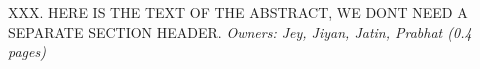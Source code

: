 XXX.  HERE IS THE TEXT OF THE ABSTRACT, WE DONT NEED A SEPARATE SECTION HEADER.
\textit{Owners: Jey, Jiyan, Jatin, Prabhat (0.4 pages)}
